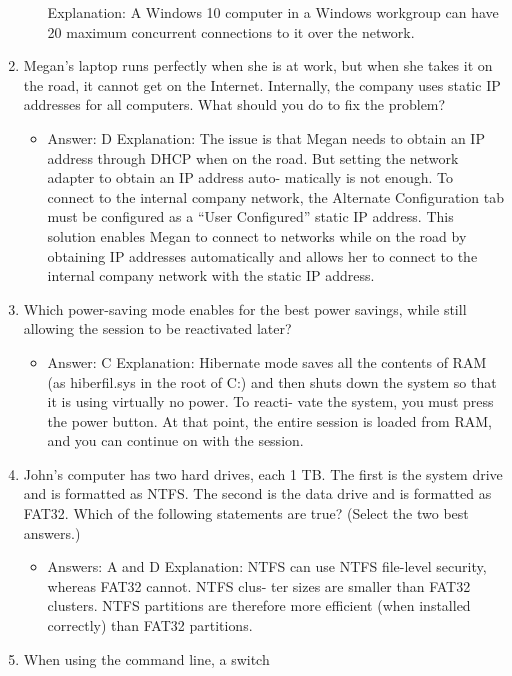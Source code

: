 \documentclass{article}
\begin{document}
\begin{enumerate}
\begin{itemize}
Explanation: A Windows 10 computer in a Windows workgroup can have 20 maximum
concurrent connections to it over the network.
    \end{itemize}
    \item Megan’s laptop runs perfectly when she is at work, but when she
takes it on the road, it cannot get on the Internet. Internally, the
company uses static IP addresses for all computers. What should
you do to fix the problem?
    \begin{itemize}
        \item Answer: D
Explanation: The issue is that Megan needs to obtain an IP address through DHCP
when on the road. But setting the network adapter to obtain an IP address auto-
matically is not enough. To connect to the internal company network, the Alternate
Configuration tab must be configured as a “User Configured” static IP address. This
solution enables Megan to connect to networks while on the road by obtaining IP
addresses automatically and allows her to connect to the internal company network
with the static IP address.
    \end{itemize}
    \item Which power-saving mode enables for the best power savings,
while still allowing the session to be reactivated later?
    \begin{itemize}
        \item  Answer: C
Explanation: Hibernate mode saves all the contents of RAM (as hiberfil.sys in the root
of C:) and then shuts down the system so that it is using virtually no power. To reacti-
vate the system, you must press the power button. At that point, the entire session is
loaded from RAM, and you can continue on with the session.
    \end{itemize}
    \item John’s computer has two hard drives, each 1 TB. The first is the
system drive and is formatted as NTFS. The second is the data
drive and is formatted as FAT32. Which of the following statements
are true? (Select the two best answers.)
    \begin{itemize}
        \item Answers: A and D
Explanation: NTFS can use NTFS file-level security, whereas FAT32 cannot. NTFS clus-
ter sizes are smaller than FAT32 clusters. NTFS partitions are therefore more efficient
(when installed correctly) than FAT32 partitions.
    \end{itemize}
    \item When using the command line, a switch

\end{enumerate}
\end{document}
